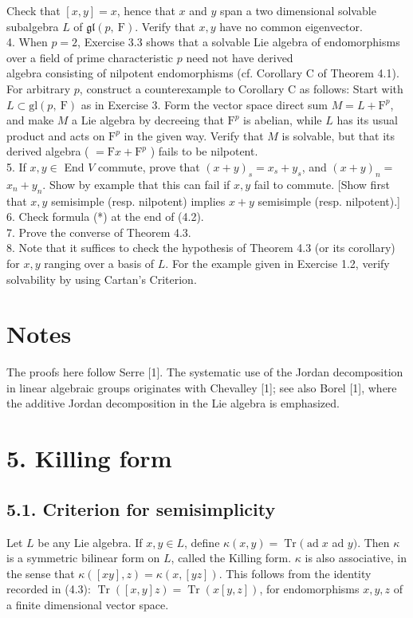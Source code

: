\documentclass[10pt]{article}
\begin{document}
Check that $[x, y]=x$, hence that $x$ and $y$ span a two dimensional solvable subalgebra $L$ of $\mathfrak{g l}(p, \mathrm{~F})$. Verify that $x, y$ have no common eigenvector.\\
4. When $p=2$, Exercise 3.3 shows that a solvable Lie algebra of endomorphisms over a field of prime characteristic $p$ need not have derived\\
algebra consisting of nilpotent endomorphisms (cf. Corollary C of Theorem 4.1). For arbitrary $p$, construct a counterexample to Corollary C as follows: Start with $L \subset \mathrm{gl}(p, \mathrm{~F})$ as in Exercise 3. Form the vector space direct sum $M=L+\mathrm{F}^{p}$, and make $M$ a Lie algebra by decreeing that $\mathrm{F}^{p}$ is abelian, while $L$ has its usual product and acts on $\mathrm{F}^{p}$ in the given way. Verify that $M$ is solvable, but that its derived algebra ( $=\mathrm{F} x+\mathrm{F}^{p}$ ) fails to be nilpotent.\\
5. If $x, y \in$ End $V$ commute, prove that $(x+y)_{s}=x_{s}+y_{s}$, and $(x+y)_{n}=$ $x_{n}+y_{n}$. Show by example that this can fail if $x, y$ fail to commute. [Show first that $x, y$ semisimple (resp. nilpotent) implies $x+y$ semisimple (resp. nilpotent).]\\
6. Check formula (*) at the end of (4.2).\\
7. Prove the converse of Theorem 4.3.\\
8. Note that it suffices to check the hypothesis of Theorem 4.3 (or its corollary) for $x, y$ ranging over a basis of $L$. For the example given in Exercise 1.2, verify solvability by using Cartan's Criterion.

\section*{Notes}
The proofs here follow Serre [1]. The systematic use of the Jordan decomposition in linear algebraic groups originates with Chevalley [1]; see also Borel [1], where the additive Jordan decomposition in the Lie algebra is emphasized.

\section*{5. Killing form}
\subsection*{5.1. Criterion for semisimplicity}
Let $L$ be any Lie algebra. If $x, y \in L$, define $\kappa(x, y)=\operatorname{Tr}(\operatorname{ad} x$ ad $y)$. Then $\kappa$ is a symmetric bilinear form on $L$, called the Killing form. $\kappa$ is also associative, in the sense that $\kappa([x y], z)=\kappa(x,[y z])$. This follows from the identity recorded in (4.3): $\operatorname{Tr}([x, y] z)=\operatorname{Tr}(x[y, z])$, for endomorphisms $x, y, z$ of a finite dimensional vector space.
\end{document}
